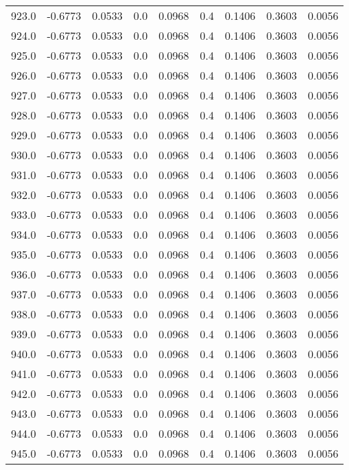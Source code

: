 \begin{longtable}{lrrrrrrrr}
923.0 & -0.6773 & 0.0533 & 0.0 & 0.0968 & 0.4 & 0.1406 & 0.3603 & 0.0056 \\
924.0 & -0.6773 & 0.0533 & 0.0 & 0.0968 & 0.4 & 0.1406 & 0.3603 & 0.0056 \\
925.0 & -0.6773 & 0.0533 & 0.0 & 0.0968 & 0.4 & 0.1406 & 0.3603 & 0.0056 \\
926.0 & -0.6773 & 0.0533 & 0.0 & 0.0968 & 0.4 & 0.1406 & 0.3603 & 0.0056 \\
927.0 & -0.6773 & 0.0533 & 0.0 & 0.0968 & 0.4 & 0.1406 & 0.3603 & 0.0056 \\
928.0 & -0.6773 & 0.0533 & 0.0 & 0.0968 & 0.4 & 0.1406 & 0.3603 & 0.0056 \\
929.0 & -0.6773 & 0.0533 & 0.0 & 0.0968 & 0.4 & 0.1406 & 0.3603 & 0.0056 \\
930.0 & -0.6773 & 0.0533 & 0.0 & 0.0968 & 0.4 & 0.1406 & 0.3603 & 0.0056 \\
931.0 & -0.6773 & 0.0533 & 0.0 & 0.0968 & 0.4 & 0.1406 & 0.3603 & 0.0056 \\
932.0 & -0.6773 & 0.0533 & 0.0 & 0.0968 & 0.4 & 0.1406 & 0.3603 & 0.0056 \\
933.0 & -0.6773 & 0.0533 & 0.0 & 0.0968 & 0.4 & 0.1406 & 0.3603 & 0.0056 \\
934.0 & -0.6773 & 0.0533 & 0.0 & 0.0968 & 0.4 & 0.1406 & 0.3603 & 0.0056 \\
935.0 & -0.6773 & 0.0533 & 0.0 & 0.0968 & 0.4 & 0.1406 & 0.3603 & 0.0056 \\
936.0 & -0.6773 & 0.0533 & 0.0 & 0.0968 & 0.4 & 0.1406 & 0.3603 & 0.0056 \\
937.0 & -0.6773 & 0.0533 & 0.0 & 0.0968 & 0.4 & 0.1406 & 0.3603 & 0.0056 \\
938.0 & -0.6773 & 0.0533 & 0.0 & 0.0968 & 0.4 & 0.1406 & 0.3603 & 0.0056 \\
939.0 & -0.6773 & 0.0533 & 0.0 & 0.0968 & 0.4 & 0.1406 & 0.3603 & 0.0056 \\
940.0 & -0.6773 & 0.0533 & 0.0 & 0.0968 & 0.4 & 0.1406 & 0.3603 & 0.0056 \\
941.0 & -0.6773 & 0.0533 & 0.0 & 0.0968 & 0.4 & 0.1406 & 0.3603 & 0.0056 \\
942.0 & -0.6773 & 0.0533 & 0.0 & 0.0968 & 0.4 & 0.1406 & 0.3603 & 0.0056 \\
943.0 & -0.6773 & 0.0533 & 0.0 & 0.0968 & 0.4 & 0.1406 & 0.3603 & 0.0056 \\
944.0 & -0.6773 & 0.0533 & 0.0 & 0.0968 & 0.4 & 0.1406 & 0.3603 & 0.0056 \\
945.0 & -0.6773 & 0.0533 & 0.0 & 0.0968 & 0.4 & 0.1406 & 0.3603 & 0.0056 \\

\end{longtable}
